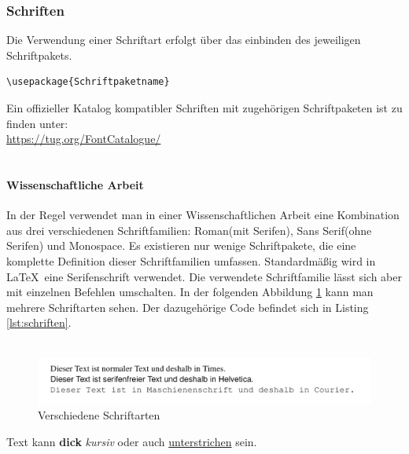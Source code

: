 \subsubsection{Schriften}
Die Verwendung einer Schriftart erfolgt über das einbinden des jeweiligen Schriftpakets.
\begin{verbatim}
\usepackage{Schriftpaketname}
\end{verbatim}
Ein offizieller Katalog kompatibler Schriften mit zugehörigen Schriftpaketen ist zu finden unter:\\ \url{https://tug.org/FontCatalogue/}\\\\
\paragraph{Wissenschaftliche Arbeit}In der Regel verwendet man in einer Wissenschaftlichen Arbeit eine Kombination aus drei verschiedenen Schriftfamilien: Roman(mit Serifen), Sans Serif(ohne Serifen) und Monospace. Es existieren nur wenige Schriftpakete, die eine komplette Definition dieser Schriftfamilien umfassen. Standardmäßig wird in \LaTeX\ eine Serifenschrift verwendet. Die verwendete Schriftfamilie lässt sich aber mit einzelnen Befehlen umschalten. In der folgenden Abbildung \ref{fig:schriften} kann man mehrere Schriftarten sehen. Der dazugehörige Code befindet sich in Listing \ref{lst:schriften}.\\\\
\begin{figure}[H]
    \centering
    \includegraphics[scale=0.3]{graphics/schrift1.png}
    \caption[Schriften]{Verschiedene Schriftarten}
    \label{fig:schriften}
\end{figure}
Text kann \textbf{dick} \textit{kursiv} oder auch \underline{unterstrichen} sein.
\pagebreak

